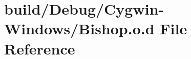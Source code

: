 \hypertarget{_cygwin-_windows_2_bishop_8o_8d}{}\section{build/\+Debug/\+Cygwin-\/\+Windows/\+Bishop.o.\+d File Reference}
\label{_cygwin-_windows_2_bishop_8o_8d}
